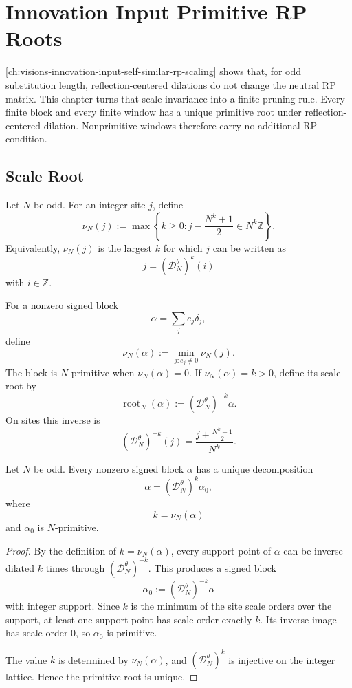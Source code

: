 \chapter{Innovation Input Primitive RP Roots}
\label{ch:visions-innovation-input-primitive-rp-roots}

\autoref{ch:visions-innovation-input-self-similar-rp-scaling} shows that,
for odd substitution length, reflection-centered dilations do not change
the neutral RP matrix. This chapter turns that scale invariance into a
finite pruning rule. Every finite block and every finite window has a
unique primitive root under reflection-centered dilation. Nonprimitive
windows therefore carry no additional RP condition.

\section{Scale Root}
\label{sec:innovation-input-scale-root}

\begin{definition}
\label{def:innovation-input-single-site-scale-order}
Let $N$ be odd. For an integer site $j$, define
$$
\nu_N(j)
:=
\max\left\{
k\ge0:
j-\frac{N^k+1}{2}\in N^k\mathbb Z
\right\}.
$$
Equivalently, $\nu_N(j)$ is the largest $k$ for which $j$ can be written
as
$$
j=(\mathcal D_N^\theta)^k(i)
$$
with $i\in\mathbb Z$.
\end{definition}

\begin{definition}
\label{def:innovation-input-block-scale-order-root}
For a nonzero signed block
$$
\alpha=\sum_j e_j\delta_j,
$$
define
$$
\nu_N(\alpha)
:=
\min_{j:e_j\ne0}\nu_N(j).
$$
The block is $N$-primitive when $\nu_N(\alpha)=0$. If
$\nu_N(\alpha)=k>0$, define its scale root by
$$
\operatorname{root}_N(\alpha)
:=
(\mathcal D_N^\theta)^{-k}\alpha.
$$
On sites this inverse is
$$
(\mathcal D_N^\theta)^{-k}(j)
=
\frac{j+\frac{N^k-1}{2}}{N^k}.
$$
\end{definition}

\begin{theorem}
\label{thm:innovation-input-unique-primitive-block-root}
Let $N$ be odd. Every nonzero signed block $\alpha$ has a unique
decomposition
$$
\alpha=(\mathcal D_N^\theta)^k\alpha_0,
$$
where
$$
k=\nu_N(\alpha)
$$
and $\alpha_0$ is $N$-primitive.
\end{theorem}

\begin{proof}
By the definition of $k=\nu_N(\alpha)$, every support point of $\alpha$
can be inverse-dilated $k$ times through
$(\mathcal D_N^\theta)^{-k}$. This produces a signed block
$$
\alpha_0:=(\mathcal D_N^\theta)^{-k}\alpha
$$
with integer support. Since $k$ is the minimum of the site scale orders
over the support, at least one support point has scale order exactly $k$.
Its inverse image has scale order $0$, so $\alpha_0$ is primitive.

The value $k$ is determined by $\nu_N(\alpha)$, and
$(\mathcal D_N^\theta)^k$ is injective on the integer lattice. Hence the
primitive root is unique.
\end{proof}

